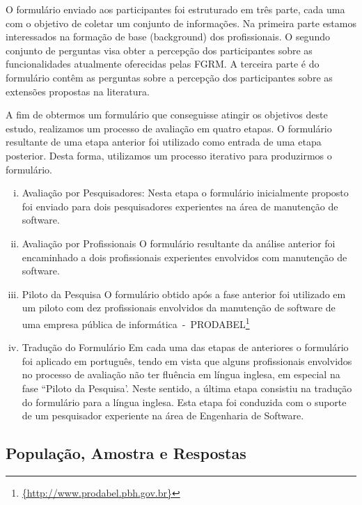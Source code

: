 O formulário enviado aos participantes foi estruturado em três parte, cada uma
com o objetivo de coletar um conjunto de informações. Na primeira parte estamos
interessados na formação de base (background) dos profissionais. O segundo
conjunto de perguntas visa obter a percepção dos participantes sobre as
funcionalidades atualmente oferecidas pelas FGRM\@. A terceira parte é do
formulário contêm as perguntas sobre a percepção dos participantes sobre as
extensões propostas na literatura. 

A fim de obtermos um formulário que conseguisse atingir os objetivos deste
estudo, realizamos um processo de avaliação em quatro etapas. O formulário
resultante de uma etapa anterior foi utilizado como entrada de uma etapa
posterior. Desta forma, utilizamos um processo iterativo para produzirmos o
formulário.
\begin{enumerate}[(i)]
	\item Avaliação por Pesquisadores: Nesta etapa o formulário inicialmente
		proposto foi enviado para dois pesquisadores experientes na área de
		manutenção de software.
	\item Avaliação por Profissionais O formulário resultante da análise
		anterior foi encaminhado a dois profissionais experientes envolvidos com
		manutenção de software. 
	\item Piloto da Pesquisa O formulário obtido após a fase anterior foi
		utilizado em um piloto com
		dez profissionais envolvidos da manutenção de software de uma empresa
		pública de
		informática~-~PRODABEL\footnote{\url{{http://www.prodabel.pbh.gov.br}}}
	\item Tradução do Formulário Em cada uma das etapas de anteriores o
		formulário foi aplicado em
		português, tendo em vista que alguns profissionais envolvidos no
		processo de avaliação não
		ter fluência em língua inglesa, em especial na fase ``Piloto da
		Pesquisa'. Neste sentido, a última etapa  consistiu na tradução do
		formulário para a língua inglesa.  Esta etapa foi conduzida com  o
		suporte de um pesquisador experiente na área de Engenharia de Software.	
\end{enumerate}

\subsection{População, Amostra e Respostas}
\label{subsec:populacao_amostra_respostas}

